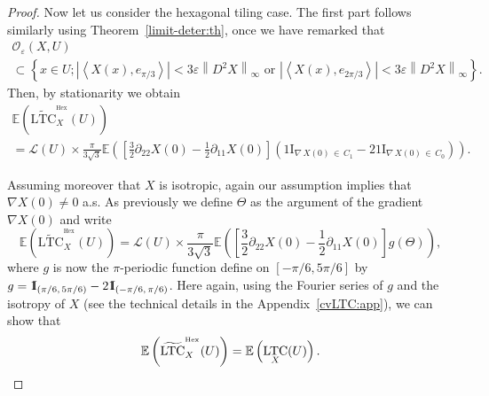 \documentclass[10pt]{amsart}
\theoremstyle{definition}\newtheorem{defi}[theo]{Definition}\newtheorem{rema}[theo]{Remark}\newtheorem{exam}[theo]{Example}\newtheorem{exem}[theo]{Example}\newtheorem{nota}[theo]{Notation}
\newcommand{\E}{\mathbb{E}}
\newcommand{\ind}{{1\!\!\mathrm{I}}}
\newcommand{\eps}{\varepsilon}
\DeclareMathOperator{\LTC}{LTC}
\DeclareMathOperator{\Hex}{Hex}
\newcommand{\tLTC}{\widetilde{\mathrm{LTC}}}
\newcommand{\calL}{\mathcal{L}}
\newcommand{\calO}{\mathcal{O}}
\begin{document}
\begin{proof}

Now let us consider the hexagonal tiling case. The first part follows similarly using Theorem~\ref{limit-deter:th}, once we have remarked that
\begin{multline*}
{\calO}_{\eps}(X,U)\\
\subset \left\{ x\in U ;\left|\left\langle X(x), e_{\pi/3}\right\rangle\right|<3\eps\left\|D^2X\right\|_\infty \text{ or } \left|\left\langle X(x), e_{2\pi/3}\right\rangle\right|<3\eps\left\|D^2X\right\|_\infty\right\}.
\end{multline*}
Then, by stationarity we obtain
\begin{multline*}
\E\left(\tLTC^{^{\Hex}}_{X}(U)\right)\\
={\calL}(U)\times \frac{\pi}{3\sqrt{3}}\E\left(\left[\frac{3}{2}\partial_{22}X(0)
-\frac{1}{2}\partial_{11}X(0)\right]\left(\ind_{\nabla\,X(0)\,\in\,C_1}-2\ind_{\nabla\,X(0)\,\in\,C_0}\right)\right).
\end{multline*}

\pagebreak

Assuming moreover that $X$ is isotropic, again our assumption implies that $\nabla X(0)\neq 0$ a.s. As previously we define $\Theta$ as the argument of the gradient $\nabla X(0)$ and write
\[
\E\left(\tLTC^{^{\Hex}}_{X}(U)\right)=
\calL(U)\times
\frac{\pi}{3\sqrt{3}}\E\left(\left[\frac{3}{2}\partial_{22}X(0)
-\frac{1}{2}\partial_{11}X(0)\right]g(\Theta)\right),
\]
where $g$ is now the $\pi$-periodic function define on $[-\pi/6,5\pi/6]$ by $g=\ind_{(\pi/6,\,5\pi/6)}\linebreak-2\ind_{(-\pi/6,\,\pi/6)}$. Here again, using the Fourier series of $g$ and the isotropy of $X$ (see the technical details in the Appendix~\ref{cvLTC:app}), we can show that
\[
\E\left(\tLTC^{^{\Hex}}_{X}(U)\right) =\E\left(\LTC_X(U)\right).\qedhere
\]
\end{proof}
\end{document}
